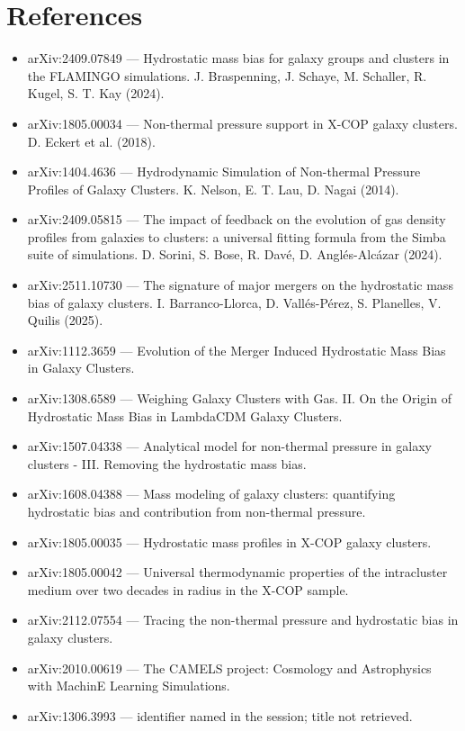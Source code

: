 \documentclass[11pt,a4paper]{article}
\begin{document}
\section*{References}
\begin{itemize}
\item arXiv:2409.07849 --- Hydrostatic mass bias for galaxy groups and clusters in the FLAMINGO simulations. J. Braspenning, J. Schaye, M. Schaller, R. Kugel, S. T. Kay (2024).
\item arXiv:1805.00034 --- Non-thermal pressure support in X-COP galaxy clusters. D. Eckert et al. (2018).
\item arXiv:1404.4636 --- Hydrodynamic Simulation of Non-thermal Pressure Profiles of Galaxy Clusters. K. Nelson, E. T. Lau, D. Nagai (2014).
\item arXiv:2409.05815 --- The impact of feedback on the evolution of gas density profiles from galaxies to clusters: a universal fitting formula from the Simba suite of simulations. D. Sorini, S. Bose, R. Davé, D. Anglés-Alcázar (2024).
\item arXiv:2511.10730 --- The signature of major mergers on the hydrostatic mass bias of galaxy clusters. I. Barranco-Llorca, D. Vallés-Pérez, S. Planelles, V. Quilis (2025).
\item arXiv:1112.3659 --- Evolution of the Merger Induced Hydrostatic Mass Bias in Galaxy Clusters.
\item arXiv:1308.6589 --- Weighing Galaxy Clusters with Gas. II. On the Origin of Hydrostatic Mass Bias in LambdaCDM Galaxy Clusters.
\item arXiv:1507.04338 --- Analytical model for non-thermal pressure in galaxy clusters - III. Removing the hydrostatic mass bias.
\item arXiv:1608.04388 --- Mass modeling of galaxy clusters: quantifying hydrostatic bias and contribution from non-thermal pressure.
\item arXiv:1805.00035 --- Hydrostatic mass profiles in X-COP galaxy clusters.
\item arXiv:1805.00042 --- Universal thermodynamic properties of the intracluster medium over two decades in radius in the X-COP sample.
\item arXiv:2112.07554 --- Tracing the non-thermal pressure and hydrostatic bias in galaxy clusters.
\item arXiv:2010.00619 --- The CAMELS project: Cosmology and Astrophysics with MachinE Learning Simulations.
\item arXiv:1306.3993 --- identifier named in the session; title not retrieved.
\end{itemize}
\end{document}
